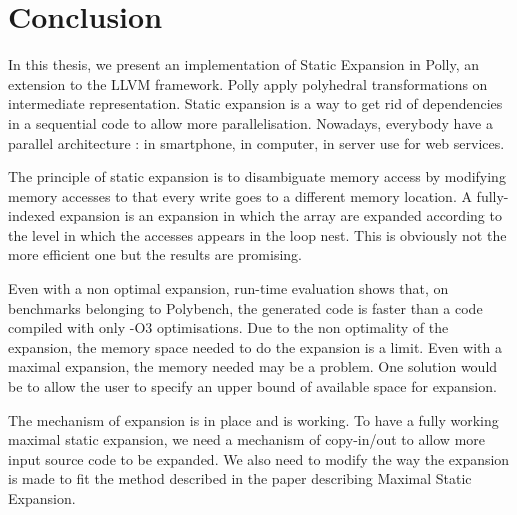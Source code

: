\chapter*{Conclusion}\label{ch:Conclusion}

In this thesis, we present an implementation of Static Expansion in Polly, an extension to the LLVM framework. Polly apply polyhedral transformations on intermediate representation. Static expansion is a way to get rid of dependencies in a sequential code to allow more parallelisation. Nowadays, everybody have a parallel architecture : in smartphone, in computer, in server use for web services. 

The principle of static expansion is to disambiguate memory access by modifying memory accesses to that every write goes to a different memory location. A fully-indexed expansion is an expansion in which the array are expanded according to the level in which the accesses appears in the loop nest. This is obviously not the more efficient one but the results are promising.

Even with a non optimal expansion, run-time evaluation shows that, on benchmarks belonging to Polybench, the generated code is faster than a code compiled with only -O3 optimisations. Due to the non optimality of the expansion, the memory space needed to do the expansion is a limit. Even with a maximal expansion, the memory needed may be a problem. One solution would be to allow the user to specify an upper bound of available space for expansion.

The mechanism of expansion is in place and is working. To have a fully working maximal static expansion, we need a mechanism of copy-in/out to allow more input source code to be expanded. We also need to modify the way the expansion is made to fit the method described in the paper describing Maximal Static Expansion\cite{Polly}.